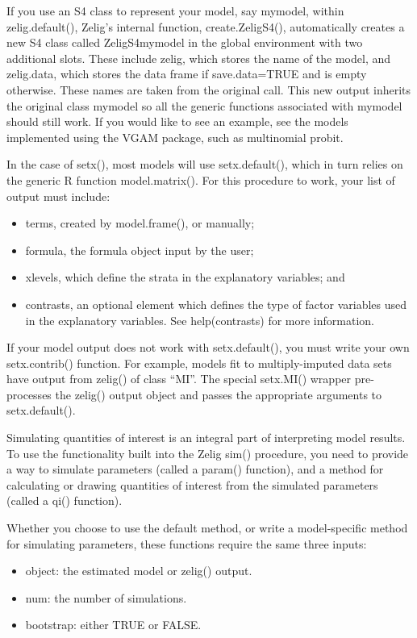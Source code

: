 \documentclass[letterpaper,10pt,english]{sphinxmanual}
\begin{document}
If you use an S4 class to represent your model, say mymodel, within
zelig.default(), Zelig’s internal function, create.ZeligS4(),
automatically creates a new S4 class called ZeligS4mymodel in the global
environment with two additional slots. These include zelig, which stores
the name of the model, and zelig.data, which stores the data frame if
save.data=TRUE and is empty otherwise. These names are taken from the
original call. This new output inherits the original class mymodel so
all the generic functions associated with mymodel should still work. If
you would like to see an example, see the models implemented using the
VGAM package, such as multinomial probit.

In the case of setx(), most models will use setx.default(), which in
turn relies on the generic R function model.matrix(). For this procedure
to work, your list of output must include:
\begin{itemize}
\item {} 
terms, created by model.frame(), or manually;

\item {} 
formula, the formula object input by the user;

\item {} 
xlevels, which define the strata in the explanatory variables; and

\item {} 
contrasts, an optional element which defines the type of factor
variables used in the explanatory variables. See help(contrasts) for
more information.

\end{itemize}

If your model output does not work with setx.default(), you must write
your own setx.contrib() function. For example, models fit to
multiply-imputed data sets have output from zelig() of class “MI”. The
special setx.MI() wrapper pre-processes the zelig() output object and
passes the appropriate arguments to setx.default().

Simulating quantities of interest is an integral part of interpreting
model results. To use the functionality built into the Zelig sim()
procedure, you need to provide a way to simulate parameters (called a
param() function), and a method for calculating or drawing quantities of
interest from the simulated parameters (called a qi() function).

Whether you choose to use the default method, or write a model-specific
method for simulating parameters, these functions require the same three
inputs:
\begin{itemize}
\item {} 
object: the estimated model or zelig() output.

\item {} 
num: the number of simulations.

\item {} 
bootstrap: either TRUE or FALSE.

\end{itemize}
\end{document}
